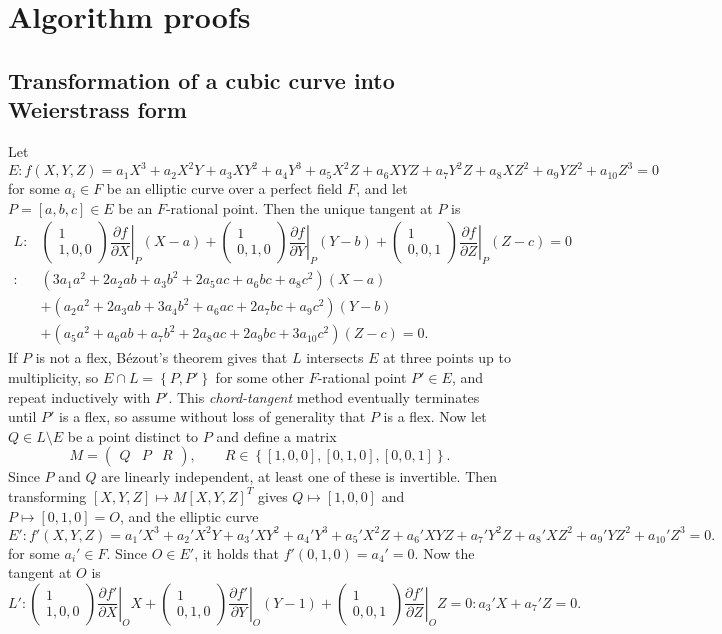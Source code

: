 \documentclass{article}
\newcommand{\val}[1]{\left. #1 \right\rvert}
\newcommand{\rb}[1]{\left( #1 \right)}
\renewcommand{\sb}[1]{\left[ #1 \right]}
\newcommand{\cb}[1]{\left\{ #1 \right\}}
\newcommand{\two}[2]{\begin{pmatrix} #1 \\ #2 \end{pmatrix}}
\newcommand{\three}[3]{\begin{pmatrix} #1 & #2 & #3 \end{pmatrix}}
\theoremstyle{definition}\newtheorem*{definition}{Definition}
\theoremstyle{definition}\newtheorem*{example}{Example}
\theoremstyle{definition}\newtheorem*{remark}{Remark}
\begin{document}
\pagebreak

\section{Algorithm proofs}

\subsection{Transformation of a cubic curve into Weierstrass form}

Let
$$ E : f\rb{X, Y, Z} = a_1X^3 + a_2X^2Y + a_3XY^2 + a_4Y^3 + a_5X^2Z + a_6XYZ + a_7Y^2Z + a_8XZ^2 + a_9YZ^2 + a_{10}Z^3 = 0 $$
for some $ a_i \in F $ be an elliptic curve over a perfect field $ F $, and let $ P = \sb{a, b, c} \in E $ be an $ F $-rational point. Then the unique tangent at $ P $ is
\begin{align*}
L
: & \two{1}{1, 0, 0}\val{\dfrac{\partial f}{\partial X}}_P\rb{X - a} + \two{1}{0, 1, 0}\val{\dfrac{\partial f}{\partial Y}}_P\rb{Y - b} + \two{1}{0, 0, 1}\val{\dfrac{\partial f}{\partial Z}}_P\rb{Z - c} = 0 \\
: & \rb{3a_1a^2 + 2a_2ab + a_3b^2 + 2a_5ac + a_6bc + a_8c^2}\rb{X - a} \\
& + \rb{a_2a^2 + 2a_3ab + 3a_4b^2 + a_6ac + 2a_7bc + a_9c^2}\rb{Y - b} \\
& + \rb{a_5a^2 + a_6ab + a_7b^2 + 2a_8ac + 2a_9bc + 3a_{10}c^2}\rb{Z - c} = 0.
\end{align*}
If $ P $ is not a flex, Bézout's theorem gives that $ L $ intersects $ E $ at three points up to multiplicity, so $ E \cap L = \cb{P, P'} $ for some other $ F $-rational point $ P' \in E $, and repeat inductively with $ P' $. This \emph{chord-tangent} method eventually terminates until $ P' $ is a flex, so assume without loss of generality that $ P $ is a flex. Now let $ Q \in L \setminus E $ be a point distinct to $ P $ and define a matrix
$$ M = \three{Q}{P}{R}, \qquad R \in \cb{\sb{1, 0, 0}, \sb{0, 1, 0}, \sb{0, 0, 1}}. $$
Since $ P $ and $ Q $ are linearly independent, at least one of these is invertible. Then transforming $ \sb{X, Y, Z} \mapsto M\sb{X, Y, Z}^T $ gives $ Q \mapsto \sb{1, 0, 0} $ and $ P \mapsto \sb{0, 1, 0} = O $, and the elliptic curve
$$ E' : f'\rb{X, Y, Z} = a_1'X^3 + a_2'X^2Y + a_3'XY^2 + a_4'Y^3 + a_5'X^2Z + a_6'XYZ + a_7'Y^2Z + a_8'XZ^2 + a_9'YZ^2 + a_{10}'Z^3 = 0. $$
for some $ a_i' \in F $. Since $ O \in E' $, it holds that $ f'\rb{0, 1, 0} = a_4' = 0 $. Now the tangent at $ O $ is
$$ L' : \two{1}{1, 0, 0}\val{\dfrac{\partial f'}{\partial X}}_OX + \two{1}{0, 1, 0}\val{\dfrac{\partial f'}{\partial Y}}_O\rb{Y - 1} + \two{1}{0, 0, 1}\val{\dfrac{\partial f'}{\partial Z}}_OZ = 0 : a_3'X + a_7'Z = 0. $$
\end{document}

